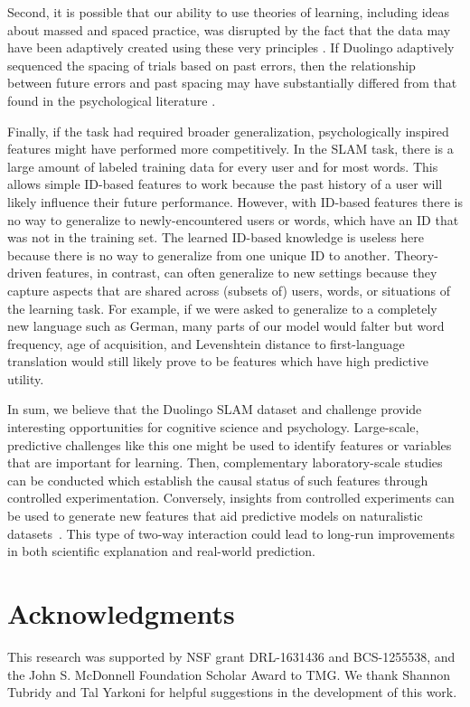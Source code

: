 \documentclass[11pt,a4paper]{article}
\begin{document}
Second, it is possible that our ability to use theories of learning, including
ideas about massed and spaced practice, was disrupted by the fact that the data
may have been adaptively created using these very principles
\cite{settles2016trainable}. If Duolingo adaptively sequenced the spacing of
trials based on past errors, then the relationship between future errors and
past spacing may have substantially differed from that found in the psychological literature
\cite{Cepeda:2006aa}.

Finally, if the task had required broader generalization, psychologically inspired 
features might have performed more competitively. In the SLAM
task, there is a large amount of labeled training data for every user and for
most words. This allows simple ID-based features to work because the past
history of a user will likely influence their future performance. However, with
 ID-based features there is no way to generalize to newly-encountered users or 
 words, which have an ID that was not in the training set. The learned 
ID-based knowledge is useless here because there is no way to generalize from one 
unique ID to another. Theory-driven features, in
contrast, can often generalize to new settings because they capture aspects that 
are shared across (subsets of) users, words, or situations of the learning task.  For example, if we were asked to generalize to
a completely new language such as German, many parts of our model would falter
but word frequency, age of acquisition, and Levenshtein distance to
first-language translation would still likely prove to be features which
have high predictive utility.

In sum, we believe that the Duolingo SLAM dataset and challenge provide
interesting opportunities for cognitive science and psychology. 
Large-scale, predictive challenges like this one
might be used to identify features or variables that are important for learning.
Then, complementary laboratory-scale studies can be conducted which
establish the causal status of such features through controlled experimentation.
Conversely, insights from controlled experiments can be used to generate
new features that aid predictive models on naturalistic datasets~\cite{Griffiths:2015aa,Goldstone:2016aa}. This type of
two-way interaction could lead to long-run improvements in both scientific
explanation and real-world prediction.

\section{Acknowledgments}
This research was supported by NSF grant DRL-1631436 and BCS-1255538,
and the John S. McDonnell Foundation Scholar Award to TMG.  We thank
Shannon Tubridy and Tal Yarkoni for helpful suggestions in the development
of this work.



\end{document}

